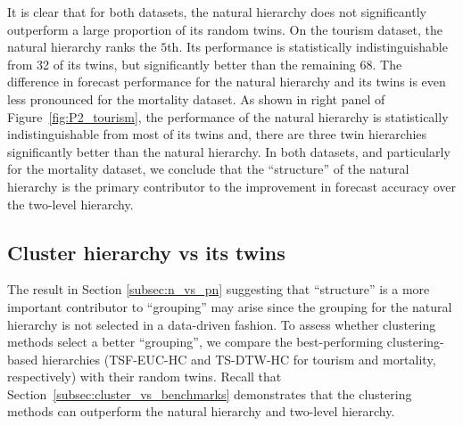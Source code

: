 \documentclass[a4paper,review,12pt,authoryear]{elsarticle}
\begin{document}
It is clear that for both datasets, the natural hierarchy does not significantly outperform a large proportion of its random twins. 
On the tourism dataset, the natural hierarchy ranks the $5$th. Its performance is statistically indistinguishable from 32 of its twins, but significantly better than the remaining 68. The difference in forecast performance for the natural hierarchy and its twins is even less pronounced for the mortality dataset. As shown in right panel of Figure~\ref{fig:P2_tourism}, the performance of the natural hierarchy is statistically indistinguishable from most of its twins and, there are three twin hierarchies significantly better than the natural hierarchy. 
In both datasets, and particularly for the mortality dataset, we conclude that the ``structure'' of the natural hierarchy is the primary contributor to the improvement in forecast accuracy over the two-level hierarchy.



\subsection{Cluster hierarchy vs its twins}
\label{subsec:P3_c_vs_pc}

The result in Section \ref{subsec:n_vs_pn} suggesting that ``structure'' is a more important contributor to ``grouping'' may arise since the grouping for the natural hierarchy is not selected in a data-driven fashion. 
To assess whether clustering methods select a better ``grouping'', we compare the best-performing clustering-based hierarchies (TSF-EUC-HC and TS-DTW-HC for tourism and mortality, respectively) with their random twins.  Recall that Section~\ref{subsec:cluster_vs_benchmarks} demonstrates that the clustering methods can outperform the natural hierarchy and two-level hierarchy. 
\end{document}

